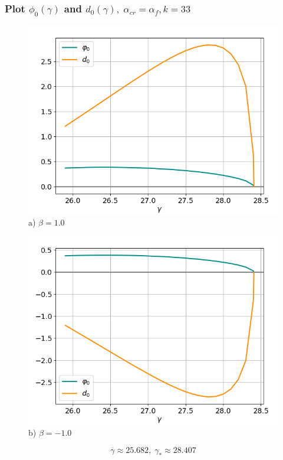 \documentclass[fullscreen=true, unicode, bookmarks=false]{beamer}
\begin{document}
\begin{frame}
\frametitle{ Plot $ \phi_0(\gamma) $ and $ d_0(\gamma), \; \alpha_{cr} = \alpha_f, k = 33 $ }

\begin{figure} 
\begin{minipage}[h]{0.49\linewidth}
\begin{center}
\includegraphics[scale=0.37]{oscillating_phi0d0_after_tangent_x0_067_beta_10.png} \\ {\scriptsize a) $ \beta = 1.0 $}
\end{center}
\end{minipage} 
\hfill
\begin{minipage}[h]{0.49\linewidth}
\begin{center}
\includegraphics[scale=0.37]{oscillating_phi0d0_after_tangent_x0_067_beta_-10.png}  \\ {\scriptsize b) $ \beta = -1.0 $}
\end{center}
\end{minipage} 
\end{figure}
$$ \overline{\gamma} \approx 25.682, \; \gamma_* \approx 28.407 $$

\end{frame}

\begin{frame}
\titlepage
\end{frame}
\end{document}
